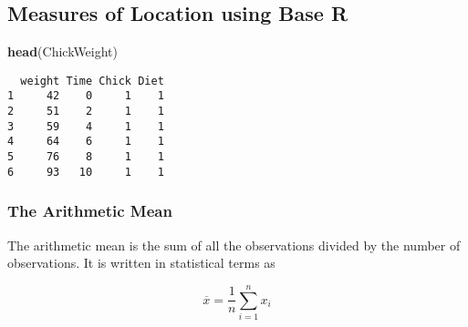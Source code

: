 \documentclass[12pt,]{article}
\newenvironment{Shaded}{\begin{snugshade}}{\end{snugshade}}
\newcommand{\KeywordTok}[1]{\textcolor[rgb]{0.13,0.29,0.53}{\textbf{#1}}}
\newcommand{\NormalTok}[1]{#1}
\theoremstyle{definition}
\theoremstyle{definition}
\theoremstyle{definition}
\theoremstyle{remark}
\begin{document}
\hypertarget{htmlwidget-eaaa2048f5b3d8835e65}{}

\subsection{Measures of Location using Base
R}\label{measures-of-location-using-base-r}

\begin{Shaded}
\begin{Highlighting}[]
\KeywordTok{head}\NormalTok{(ChickWeight)}
\end{Highlighting}
\end{Shaded}

\begin{verbatim}
  weight Time Chick Diet
1     42    0     1    1
2     51    2     1    1
3     59    4     1    1
4     64    6     1    1
5     76    8     1    1
6     93   10     1    1
\end{verbatim}

\subsubsection{The Arithmetic Mean}\label{the-arithmetic-mean}

The arithmetic mean is the sum of all the observations divided by the
number of observations. It is written in statistical terms as

\[\overline{x} = \frac{1}{n}\sum^n_{i=1}x_i\]
\end{document}
